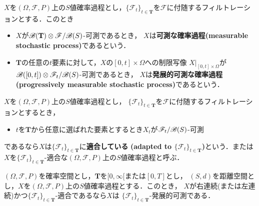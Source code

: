	$X$を$(\Omega,\mathscr{F},P)$上の$S$値確率過程とし，$\{\mathscr{F}_t\}_{t \in \mathbf{T}}$を$\mathscr{F}$に付随するフィルトレーションとする．このとき
	\begin{itemize}
		\item $X$が$\mathscr{B}(\mathbf{T}) \otimes \mathscr{F}/\mathscr{B}(S)$-可測であるとき，
			$X$は{\bf 可測な確率過程}{\bf (measurable stochastic process)}であるという．
		\item $\mathbf{T}$の任意の$t$要素に対して，$X$の$[0,t] \times \Omega$への制限写像
			$X|_{[0,t] \times \Omega}$が$\mathscr{B}([0,t]) \otimes \mathscr{F}_t/\mathscr{B}(S)$-可測であるとき，
			$X$は{\bf 発展的可測な確率過程}{\bf (progressively measurable stochastic process)}であるという．
	\end{itemize}
	
	
	\begin{screen}
		\begin{dfn}[適合]
			$X$を$(\Omega,\mathscr{F},P)$上の$S$値確率過程とし，
			$\{\mathscr{F}_t\}_{t \in \mathbf{T}}$を$\mathscr{F}$に付随するフィルトレーションとするとき，
			\begin{itemize}
				\item $t$を$\mathbf{T}$から任意に選ばれた要素とするとき$X_t$が$\mathscr{F}_t/\mathscr{B}(S)$-可測
			\end{itemize}
			であるなら$X$は$\{\mathscr{F}_t\}_{t \in \mathbf{T}}$に{\bf 適合している}
			{\bf (adapted to $\{\mathscr{F}_t\}_{t \in \mathbf{T}}$)}という．または
			$X$を$\{\mathscr{F}_t\}_{t \in \mathbf{T}}$-適合な$(\Omega,\mathscr{F},P)$上の$S$値確率過程と呼ぶ．
		\end{dfn}
	\end{screen}
	
	\begin{screen}
		\begin{thm}[右連続または左連続な適合過程は発展的可測]
			$(\Omega,\mathscr{F},P)$を確率空間とし，$\mathbf{T}$を$[0,\infty[$または$[0,T]$とし，
			$(S,d)$を距離空間とし，$X$を$(\Omega,\mathscr{F},P)$上の$S$値確率過程とする．このとき，
			$X$が右連続(または左連続)かつ$\{\mathscr{F}_t\}_{t \in \mathbf{T}}$-適合であるなら$X$は
			$\{\mathscr{F}_t\}_{t \in \mathbf{T}}$-発展的可測である．
		\end{thm}
	\end{screen}
	
